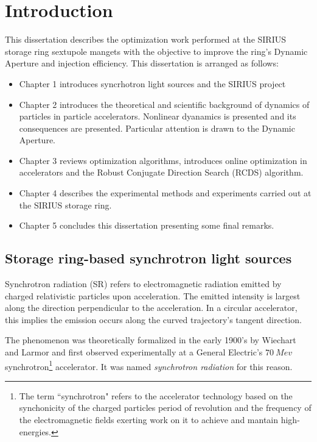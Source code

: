 \chapter{Introduction}
This dissertation describes the optimization work performed at the SIRIUS storage ring sextupole mangets with the objective to improve the ring's Dynamic Aperture and injection efficiency. This dissertation is arranged as follows:
\begin{itemize}
    \item Chapter 1 introduces syncrhotron light sources and the SIRIUS project
    \item Chapter 2 introduces the theoretical and scientific background of dynamics of particles in particle accelerators. Nonlinear dyanamics is presented and its consequences are presented. Particular attention is drawn to the Dynamic Aperture.
    \item Chapter 3 reviews optimization algorithms, introduces online optimization in accelerators and the Robust Conjugate Direction Search (RCDS) algorithm. 
    \item Chapter 4 describes the experimental methods and experiments carried out at the SIRIUS storage ring.
    \item Chapter 5 concludes this dissertation presenting some final remarks.
\end{itemize}

\section{Storage ring-based synchrotron light sources}

Synchrotron radiation (SR) refers to electromagnetic radiation emitted by charged relativistic particles upon acceleration. The emitted intensity is largest along the direction perpendicular to the acceleration. In a circular accelerator, this implies the emission occurs along the curved trajectory's tangent direction.

The phenomenon was theoretically formalized in the early 1900's by Wiechart and Larmor and first observed experimentally at a General Electric's $70~\unit{Mev}$ synchrotron\footnote{The term ``synchrotron" refers to the accelerator  technology based on the synchonicity of the charged particles period of revolution and the frequency of the electromagnetic fields exerting work on it to achieve and mantain high-energies.} accelerator. It was named \textit{synchrotron radiation} for this reason.

